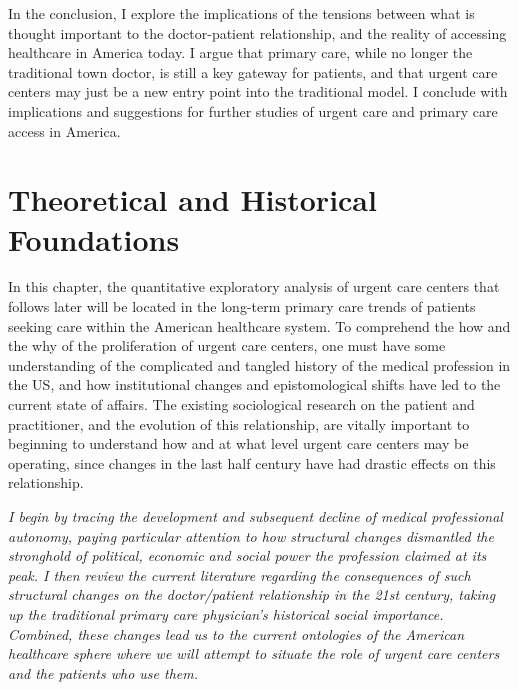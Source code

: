 \documentclass[12pt,twoside]{reedthesis}
\begin{document}
  In the conclusion, I explore the implications of the tensions between
  what is thought important to the doctor-patient relationship, and the
  reality of accessing healthcare in America today. I argue that primary
  care, while no longer the traditional town doctor, is still a key
  gateway for patients, and that urgent care centers may just be a new
  entry point into the traditional model. I conclude with implications and
  suggestions for further studies of urgent care and primary care access
  in America.
  
  \chapter*{Theoretical and Historical
  Foundations}\label{theoretical-and-historical-foundations}
  
  \setcounter{chapter}{2} \setcounter{section}{0} \doublespacing
  
  In this chapter, the quantitative exploratory analysis of urgent care
  centers that follows later will be located in the long-term primary care
  trends of patients seeking care within the American healthcare system.
  To comprehend the how and the why of the proliferation of urgent care
  centers, one must have some understanding of the complicated and tangled
  history of the medical profession in the US, and how institutional
  changes and epistomological shifts have led to the current state of
  affairs. The existing sociological research on the patient and
  practitioner, and the evolution of this relationship, are vitally
  important to beginning to understand how and at what level urgent care
  centers may be operating, since changes in the last half century have
  had drastic effects on this relationship.
  
  \emph{I begin by tracing the development and subsequent decline of
  medical professional autonomy, paying particular attention to how
  structural changes dismantled the stronghold of political, economic and
  social power the profession claimed at its peak. I then review the
  current literature regarding the consequences of such structural changes
  on the doctor/patient relationship in the 21st century, taking up the
  traditional primary care physician's historical social importance.
  Combined, these changes lead us to the current ontologies of the
  American healthcare sphere where we will attempt to situate the role of
  urgent care centers and the patients who use them.}
  
\end{document}
